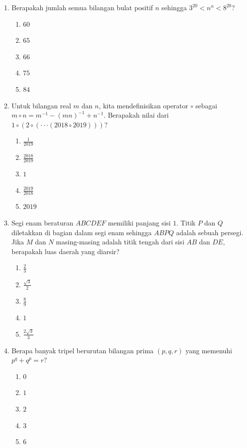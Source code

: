 \documentclass{article}
\begin{document}
\begin{enumerate}
\item Berapakah jumlah semua bilangan bulat positif $n$ sehingga $3^{20}<n^{n}<8^{20}$?
\begin{enumerate}
    \item $60$
    \item $65$
    \item $66$
    \item $75$
    \item $84$
\end{enumerate}

\item Untuk bilangan real $m$ dan $n$, kita mendefinisikan operator $\circ$ sebagai $m\circ n = m^{-1}-(mn)^{-1}+n^{-1}$. Berapakah nilai dari $1\circ(2\circ(\cdot\cdot\cdot(2018\circ2019)))$?
\begin{enumerate}
    \item $\frac{1}{2019}$
    \item $\frac{2018}{2019}$
    \item $1$
    \item $\frac{2019}{2018}$
    \item $2019$
\end{enumerate}

\item Segi enam beraturan $ABCDEF$ memiliki panjang sisi $1$. Titik $P$ dan $Q$ diletakkan di bagian dalam segi enam sehingga $ABPQ$ adalah sebuah persegi. Jika $M$ dan $N$ masing-masing adalah titik tengah dari sisi $AB$ dan $DE$, berapakah luas daerah yang diarsir?
\begin{enumerate}
    \item $\frac{2}{3}$
    \item $\frac{\sqrt{3}}{2}$
    \item $\frac{8}{9}$
    \item $1$
    \item $\frac{2\sqrt{3}}{3}$
\end{enumerate}

\item Berapa banyak tripel berurutan bilangan prima $(p,q,r)$ yang memenuhi $p^{q}+q^{p}=r$?
\begin{enumerate}
    \item $0$
    \item $1$
    \item $2$
    \item $3$
    \item $6$
\end{enumerate}


\end{enumerate}
\end{document}
